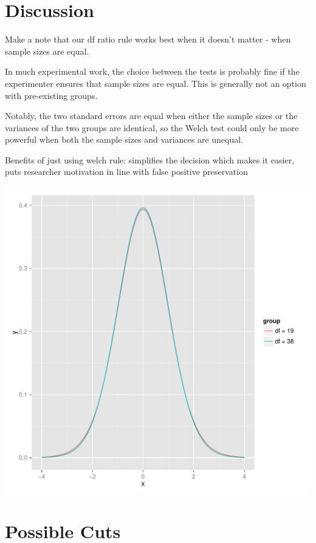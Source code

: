 \documentclass[man,a4paper,noextraspace,apacite]{apa6}\usepackage[]{graphicx}\usepackage[]{color}
\makeatletter
\def\maxwidth{ %
  \ifdim\Gin@nat@width>\linewidth
    \linewidth
  \else
    \Gin@nat@width
  \fi
}
\newenvironment{knitrout}{}{} %
\makeatother
\begin{document}
\section{Discussion}
    Make a note that our df ratio rule works best when it doesn't matter - when sample sizes are equal.
    
    In much experimental work, the choice between the tests is probably fine if the experimenter ensures that sample sizes are equal. This is generally not an option with pre-existing groups. 
    
    Notably, the two standard errors are equal when either the sample sizes or the variances of the two groups are identical, so the Welch test could only be more powerful when both the sample sizes and variances are unequal. 
    
    Benefits of just using welch rule: simplifies the decision which makes it easier, puts researcher motivation in line with false positive preservation

\begin{knitrout}
\color{fgcolor}
\includegraphics[width=\maxwidth]{figure/tdist} 

\end{knitrout}


\section{Possible Cuts}





\end{document}
